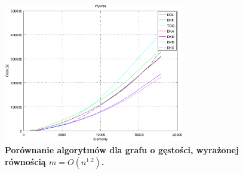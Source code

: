 \begin{figure}[!htbp]
	\centering
	\includegraphics[width=0.7\textwidth]{Chapter_IV/graph120.pdf}
	\caption{\textbf{ Porównanie algorytmów dla grafu o gęstości, wyrażonej równością $ m = O \left( n^{1.2} \right)$.}}\label{fig:plotFullGraph_1.20}
\end{figure}




